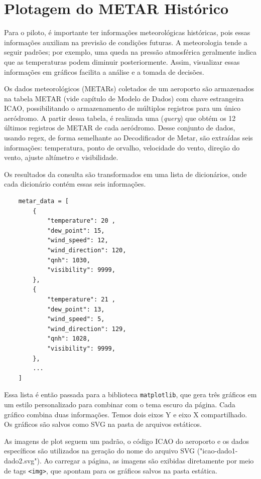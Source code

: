 \chapter{Plotagem do METAR Histórico}

Para o piloto, é importante ter informações meteorológicas históricas, pois 
essas informações auxiliam na previsão de condições futuras. A meteorologia tende 
a seguir padrões; por exemplo, uma queda na pressão atmosférica geralmente indica 
que as temperaturas podem diminuir posteriormente. Assim, visualizar essas 
informações em gráficos facilita a análise e a tomada de decisões.

Os dados meteorológicos (METARs) coletados de um aeroporto são armazenados na tabela
METAR (vide capítulo de Modelo de Dados) com chave estrangeira ICAO, possibilitando
o armazenamento de múltiplos registros para um único aeródromo. A partir dessa 
tabela, é realizada uma (\textit{query}) que obtém os 12 últimos registros 
de METAR de cada aeródromo. Desse conjunto de dados, usando regex, de forma
semelhante ao Decodificador de Metar, são extraídas seis informações: 
temperatura, ponto de orvalho, velocidade do vento, direção do vento, ajuste altímetro e visibilidade.

Os resultados da consulta são transformados em uma lista de dicionários, onde 
cada dicionário contém essas seis informações.

\begin{verbatim}
    metar_data = [
        {
            "temperature": 20 ,
            "dew_point": 15,
            "wind_speed": 12,
            "wind_direction": 120,
            "qnh": 1030,
            "visibility": 9999,
        },
        {
            "temperature": 21 ,
            "dew_point": 13,
            "wind_speed": 5,
            "wind_direction": 129,
            "qnh": 1028,
            "visibility": 9999,
        },
        ...
    ]
\end{verbatim}


Essa lista é então passada para a biblioteca \texttt{matplotlib}, que gera três 
gráficos em um estilo personalizado para combinar com o tema escuro da página. 
Cada gráfico combina duas informações. Temos dois eixos Y e eixo X compartilhado.
Os gráficos são salvos como SVG na pasta de arquivos estáticos.

As imagens de plot seguem um padrão, o código ICAO do aeroporto e os dados 
específicos são utilizados na geração do nome do arquivo SVG ("icao-dado1-dado2.svg"). 
Ao carregar a página, as imagens são exibidas diretamente por meio de tags \texttt{<img>},
 que apontam para os gráficos salvos na pasta estática.

